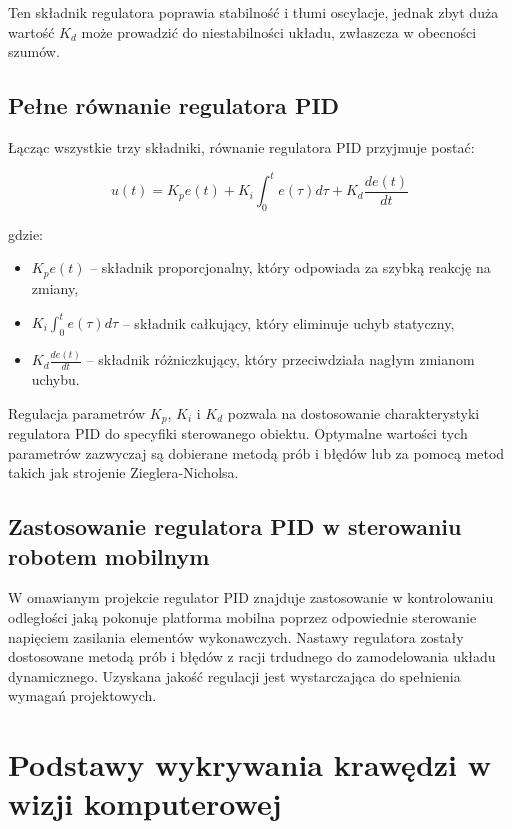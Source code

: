 Ten składnik regulatora poprawia stabilność i tłumi oscylacje, jednak zbyt duża wartość $K_d$ może prowadzić do niestabilności układu, zwłaszcza w obecności szumów.

\subsection{Pełne równanie regulatora PID}

Łącząc wszystkie trzy składniki, równanie regulatora PID przyjmuje postać:

\begin{equation}
u(t) = K_p e(t) + K_i \int_{0}^{t} e(\tau) d\tau + K_d \frac{de(t)}{dt}
\end{equation}

gdzie:
\begin{itemize}
    \item $K_p e(t)$ – składnik proporcjonalny, który odpowiada za szybką reakcję na zmiany,
    \item $K_i \int_{0}^{t} e(\tau) d\tau$ – składnik całkujący, który eliminuje uchyb statyczny,
    \item $K_d \frac{de(t)}{dt}$ – składnik różniczkujący, który przeciwdziała nagłym zmianom uchybu.
\end{itemize}

Regulacja parametrów $K_p$, $K_i$ i $K_d$ pozwala na dostosowanie charakterystyki regulatora PID do specyfiki sterowanego obiektu. Optymalne wartości tych parametrów zazwyczaj są dobierane metodą prób i błędów lub za pomocą metod takich jak strojenie Zieglera-Nicholsa.

\subsection{Zastosowanie regulatora PID w sterowaniu robotem mobilnym}

W omawianym projekcie regulator PID znajduje zastosowanie w kontrolowaniu odległości jaką pokonuje platforma mobilna poprzez odpowiednie sterowanie napięciem zasilania elementów wykonawczych. Nastawy regulatora zostały dostosowane metodą prób i błędów z racji trdudnego do zamodelowania układu dynamicznego. Uzyskana jakość regulacji jest wystarczająca do spełnienia wymagań projektowych. 

\section{Podstawy wykrywania krawędzi w wizji komputerowej}

